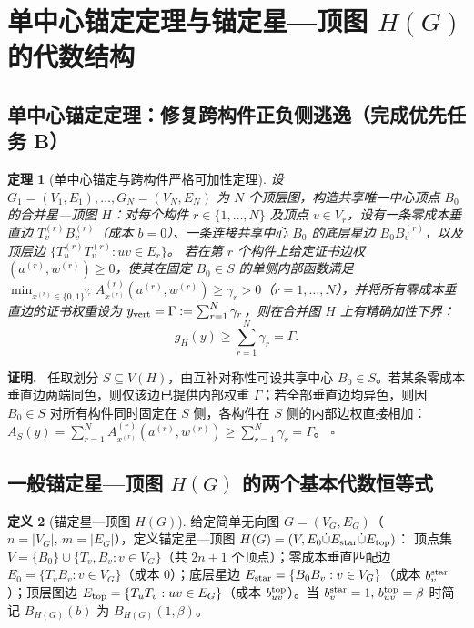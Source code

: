 \documentclass[11pt,a4paper]{ctexart}
\newtheorem{theorem}{定理}[section]
\theoremstyle{definition}
\newtheorem{definition}[theorem]{定义}
\newenvironment{proofcn}{\par\noindent\textbf{证明.}\ }{\hfill$\square$\par}
\newcommand{\1}{\boldsymbol 1}
\newcommand{\0}{\boldsymbol 0}
\begin{document}
\section{单中心锚定定理与锚定星—顶图 $H(G)$ 的代数结构}

\subsection{单中心锚定定理：修复跨构件正负侧逃逸（完成优先任务 B）}
\begin{theorem}[单中心锚定与跨构件严格可加性定理]\label{thm:anchor_additive}
设 $G_1=(V_1,E_1),\dots,G_N=(V_N,E_N)$ 为 $N$ 个顶层图，构造共享唯一中心顶点 $B_0$ 的合并星—顶图 $H$：对每个构件 $r\in\{1,\dots,N\}$ 及顶点 $v\in V_r$，设有一条零成本垂直边 $T_v^{(r)}B_v^{(r)}$（成本 $b=0$）、一条连接共享中心 $B_0$ 的底层星边 $B_0B_v^{(r)}$，以及顶层边 $\{T_u^{(r)}T_v^{(r)}:uv\in E_r\}$。
若在第 $r$ 个构件上给定证书边权 $(a^{(r)},w^{(r)})\ge 0$，使其在固定 $B_0\in S$ 的单侧内部函数满足 $\min_{x^{(r)}\in\{0,1\}^{V_r}} A_{x^{(r)}}^{(r)}(a^{(r)},w^{(r)})\ge \gamma_r > 0$（$r=1,\dots,N$），并将所有零成本垂直边的证书权重设为 $y_{\rm vert}=\Gamma:=\sum_{r=1}^N \gamma_r$，则在合并图 $H$ 上有精确加性下界：
\begin{equation}\label{eq:strict_add}
 \boxed{g_H(y)\ge \sum_{r=1}^N \gamma_r = \Gamma.}
\end{equation}
\end{theorem}
\begin{proofcn}
任取划分 $S\subseteq V(H)$，由互补对称性可设共享中心 $B_0\in S$。若某条零成本垂直边两端同色，则仅该边已提供内部权重 $\Gamma$；若全部垂直边均异色，则因 $B_0\in S$ 对所有构件同时固定在 $S$ 侧，各构件在 $S$ 侧的内部边权直接相加：$A_S(y)=\sum_{r=1}^N A_{x^{(r)}}^{(r)}(a^{(r)},w^{(r)})\ge \sum_{r=1}^N \gamma_r=\Gamma$。
\end{proofcn}

\subsection{一般锚定星—顶图 $H(G)$ 的两个基本代数恒等式}
\begin{definition}[锚定星—顶图 $H(G)$]\label{def:HG}
给定简单无向图 $G=(V_G,E_G)$（$n=|V_G|,\, m=|E_G|$），定义锚定星—顶图 $H(G)=(V,E_0\dot\cup E_{\rm star}\dot\cup E_{\rm top})$：
顶点集 $V=\{B_0\}\cup\{T_v,B_v:v\in V_G\}$（共 $2n+1$ 个顶点）；零成本垂直匹配边 $E_0=\{T_vB_v:v\in V_G\}$（成本 $0$）；底层星边 $E_{\rm star}=\{B_0B_v:v\in V_G\}$（成本 $b_v^{\rm star}$）；顶层图边 $E_{\rm top}=\{T_uT_v:uv\in E_G\}$（成本 $b_{uv}^{\rm top}$）。当 $b_v^{\rm star}=1,\, b_{uv}^{\rm top}=\beta$ 时简记 $B_{H(G)}(b)$ 为 $B_{H(G)}(1,\beta)$。
\end{definition}
\end{document}
